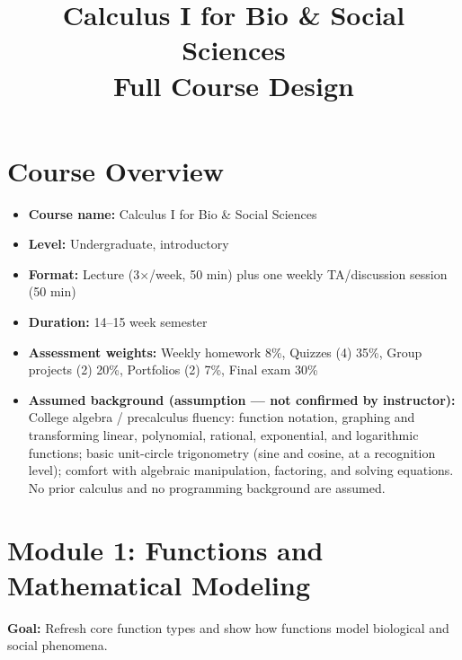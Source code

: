 \documentclass{article}
\title{Calculus I for Bio \& Social Sciences \\ \large Full Course Design}
\author{}
\date{}
\begin{document}
\maketitle
\tableofcontents

\section*{Course Overview}
\begin{itemize}[leftmargin=*]
  \item \textbf{Course name:} Calculus I for Bio \& Social Sciences
  \item \textbf{Level:} Undergraduate, introductory
  \item \textbf{Format:} Lecture (3$\times$/week, 50 min) plus one weekly TA/discussion session (50 min)
  \item \textbf{Duration:} 14--15 week semester
  \item \textbf{Assessment weights:} Weekly homework 8\%, Quizzes (4) 35\%, Group projects (2) 20\%, Portfolios (2) 7\%, Final exam 30\%
  \item \textbf{Assumed background (assumption --- not confirmed by instructor):} College algebra / precalculus fluency: function notation, graphing and transforming linear, polynomial, rational, exponential, and logarithmic functions; basic unit-circle trigonometry (sine and cosine, at a recognition level); comfort with algebraic manipulation, factoring, and solving equations. No prior calculus and no programming background are assumed.
\end{itemize}


\section{Module 1: Functions and Mathematical Modeling}
\textbf{Goal:} Refresh core function types and show how functions model biological and social phenomena.
\end{document}
